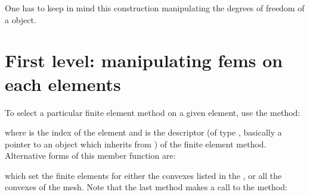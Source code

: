 \documentclass[a4paper,11pt,english]{sphinxmanual}
\begin{document}
One has to keep in mind this construction manipulating the degrees of freedom of a
 object.


\section{First level: manipulating fems on each elements}
\label{\detokenize{userdoc/bfem:first-level-manipulating-fems-on-each-elements}}
To select a particular finite element method on a given element, use the method:

\begin{sphinxVerbatim}[commandchars=\\\{\}]
 
\end{sphinxVerbatim}

where  is the index of the element and  is the descriptor (of type
, basically a pointer to an object which inherits from ) of the
finite element method. Alternative forms of this member function are:

\begin{sphinxVerbatim}[commandchars=\\\{\}]
   
                                   
  
\end{sphinxVerbatim}

which set the finite elements for either the convexes listed in the , or all the convexes of the mesh. Note that the last method makes a call to
the method:

\begin{sphinxVerbatim}[commandchars=\\\{\}]
  
\end{sphinxVerbatim}
\end{document}
